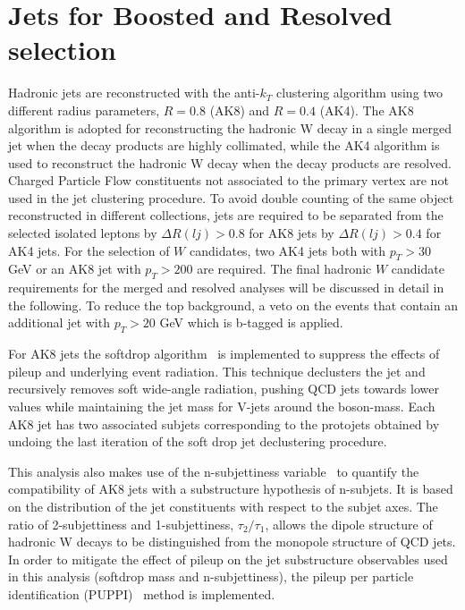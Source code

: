 \section{Jets for Boosted and Resolved selection}
Hadronic jets are reconstructed with the anti-$k_T$ clustering algorithm  using two different
radius parameters, $R = 0.8$ (AK8) and $R = 0.4$ (AK4). The AK8 algorithm is adopted for
reconstructing the hadronic W decay in a single merged jet when the decay products are highly
collimated, while the AK4 algorithm is used to reconstruct the hadronic W decay when the
decay products are resolved.
Charged Particle Flow
constituents not associated to the primary vertex are not used in the jet clustering procedure.
To avoid double counting of the same object
reconstructed in different collections, jets are required to be separated from the selected isolated
leptons by $\Delta R(lj)> 0.8 $ for AK8 jets by  $\Delta R(lj)> 0.4$ for AK4 jets.
For the selection of $W$ candidates, two AK4 jets both with $p_T>30$ GeV or an AK8 jet with  $p_T>200$ are required.
The final hadronic $W$ candidate requirements for the merged and resolved analyses
will be discussed in detail in the following. To reduce the top background, a veto on the  events that contain an additional jet with $p_T  > 20$
GeV which is b-tagged is applied.

For AK8 jets the softdrop algorithm~\cite{Larkoski2014} is implemented to suppress the effects of pileup and underlying event radiation. This technique declusters the jet and recursively removes soft wide-angle radiation, pushing QCD jets towards lower values while maintaining the jet mass for V-jets around the boson-mass. Each AK8 jet has two associated subjets corresponding to the protojets obtained by undoing the last iteration of the soft drop jet declustering procedure.

This analysis also makes use of the n-subjettiness variable~\cite{Thaler:2011gf}  to quantify the compatibility
of AK8 jets with a substructure hypothesis of n-subjets. It is based on the distribution of the
jet constituents with respect to the subjet axes. The ratio of 2-subjettiness and 1-subjettiness,
 $\tau_2 /\tau_1$, allows the dipole structure of hadronic W decays to be distinguished from the monopole
structure of QCD jets.
In order to mitigate the effect of pileup on the jet substructure observables used in this analysis
(softdrop mass and n-subjettiness), the pileup per particle identification (PUPPI)~\cite{Bertolini2014} method is
implemented.


